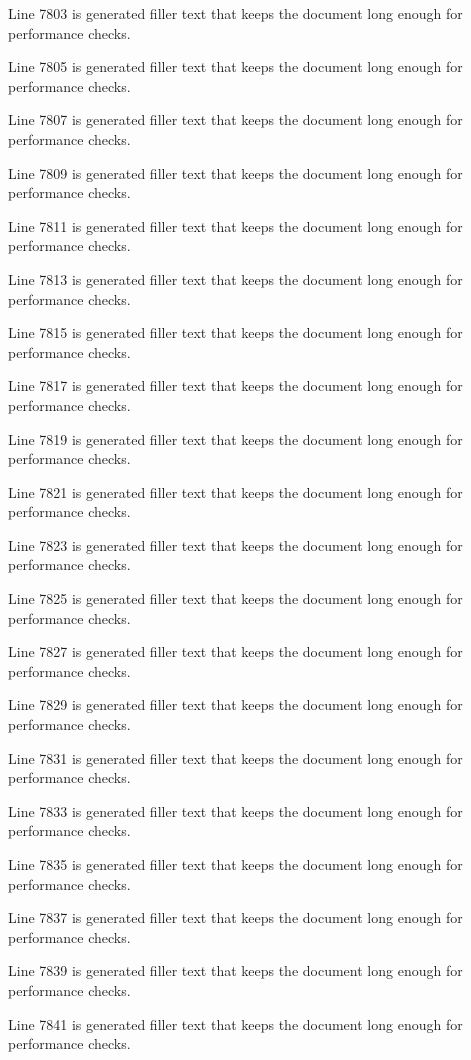 Line 7803 is generated filler text that keeps the document long enough for performance checks.

Line 7805 is generated filler text that keeps the document long enough for performance checks.

Line 7807 is generated filler text that keeps the document long enough for performance checks.

Line 7809 is generated filler text that keeps the document long enough for performance checks.

Line 7811 is generated filler text that keeps the document long enough for performance checks.

Line 7813 is generated filler text that keeps the document long enough for performance checks.

Line 7815 is generated filler text that keeps the document long enough for performance checks.

Line 7817 is generated filler text that keeps the document long enough for performance checks.

Line 7819 is generated filler text that keeps the document long enough for performance checks.

Line 7821 is generated filler text that keeps the document long enough for performance checks.

Line 7823 is generated filler text that keeps the document long enough for performance checks.

Line 7825 is generated filler text that keeps the document long enough for performance checks.

Line 7827 is generated filler text that keeps the document long enough for performance checks.

Line 7829 is generated filler text that keeps the document long enough for performance checks.

Line 7831 is generated filler text that keeps the document long enough for performance checks.

Line 7833 is generated filler text that keeps the document long enough for performance checks.

Line 7835 is generated filler text that keeps the document long enough for performance checks.

Line 7837 is generated filler text that keeps the document long enough for performance checks.

Line 7839 is generated filler text that keeps the document long enough for performance checks.

Line 7841 is generated filler text that keeps the document long enough for performance checks.

